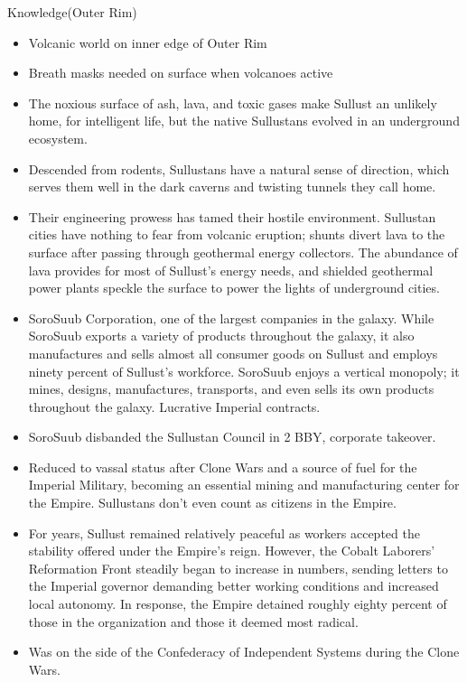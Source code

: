 \documentclass[background]{book}
\begin{document}
\begin{multicols}{2}
\difficulty\difficulty Knowledge(Outer Rim)\\
\begin{itemize}
    \item Volcanic world on inner edge of Outer Rim
    \item Breath masks needed on surface when volcanoes active
    \item The noxious surface of ash, lava, and toxic gases make Sullust an unlikely home, for intelligent life, but the native Sullustans evolved in an underground ecosystem.
    \item \advantage Descended from rodents, Sullustans have a natural sense of direction, which serves them well in the dark caverns and twisting tunnels they call home.
    \item \advantage  Their engineering prowess has tamed their hostile environment. Sullustan cities have nothing to fear from volcanic eruption; shunts divert lava to the surface after passing through geothermal energy collectors. The abundance of lava provides for most of Sullust’s energy needs, and shielded geothermal power plants speckle the surface to power the lights of underground cities.
    \item \advantage SoroSuub Corporation, one of the largest companies in the galaxy. While SoroSuub exports a variety of products throughout the galaxy, it also manufactures and sells almost all consumer goods on Sullust and employs ninety percent of Sullust’s workforce. SoroSuub enjoys a vertical monopoly; it mines, designs, manufactures, transports, and even sells its own products throughout the galaxy. Lucrative Imperial contracts.
	\item \advantage SoroSuub disbanded the Sullustan Council in 2 BBY, corporate takeover.
    \item \advantage Reduced to vassal status after Clone Wars and a source of fuel for the Imperial Military, becoming an essential mining and manufacturing center for the Empire. Sullustans don’t even count as citizens in the Empire.
    \item \advantage For years, Sullust remained relatively peaceful as workers accepted the stability offered under the Empire's reign. However, the Cobalt Laborers' Reformation Front steadily began to increase in numbers, sending letters to the Imperial governor demanding better working conditions and increased local autonomy. In response, the Empire detained roughly eighty percent of those in the organization and those it deemed most radical.
    \item \advantage Was on the side of the Confederacy of Independent Systems during the Clone Wars.

\end{itemize}
\end{multicols}
\end{document}
